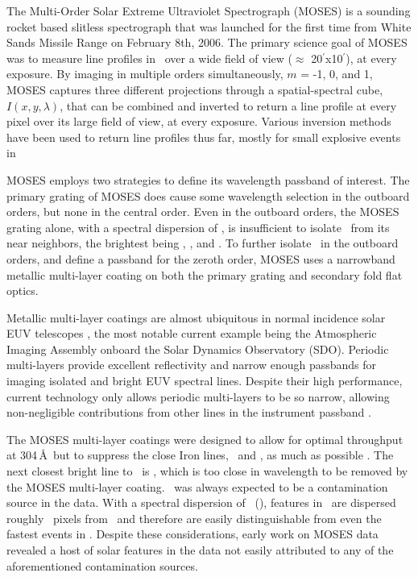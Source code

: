 	The Multi-Order Solar Extreme Ultraviolet Spectrograph (MOSES) is a sounding rocket based slitless spectrograph that was launched for the first time from White Sands Missile Range on February 8th, 2006.
	The primary science goal of MOSES was to measure line profiles in \heii \ over a wide field of view ($\approx$ 20$^{\prime}$x10$^{\prime}$), at every exposure.
	By imaging in multiple orders simultaneously, $m$ = -1, 0, and 1, MOSES captures three different projections through a spatial-spectral cube, $I(x,y,\lambda)$, that can be combined and inverted to return a line profile at every pixel over its large field of view, at every exposure.
	Various inversion methods have been used to return line profiles thus far, mostly for small explosive events in \heii\ \citep{Fox2011,Rust2019,Courrier2018}
	
	MOSES employs two strategies to define its wavelength passband of interest.
	The primary grating of MOSES does cause some wavelength selection in the outboard orders, but none in the central order.
	Even in the outboard orders, the MOSES grating alone, with a spectral dispersion of \spectdisperspix, is insufficient to isolate \heii \ from its near neighbors, the brightest being \sixi, \fexv, and \fexvi.
	To further isolate \heii\ in the outboard orders, and define a passband for the zeroth order, MOSES uses a narrowband metallic multi-layer coating on both the primary grating and secondary fold flat optics.
		
	Metallic multi-layer coatings are almost ubiquitous in normal incidence solar EUV telescopes \citep{Windt2015}, the most notable current example being the Atmospheric Imaging Assembly \citep[AIA:][]{lemen2011} onboard the Solar Dynamics Observatory (SDO).
	Periodic multi-layers provide excellent reflectivity and narrow enough passbands for imaging isolated and bright EUV spectral lines.
	Despite their high performance, current technology only allows periodic multi-layers to be so narrow, allowing non-negligible contributions from other lines in the instrument passband \citep{AIA-Response}.
	
	The MOSES multi-layer coatings were designed to allow for optimal throughput at 304\,\AA \ but to suppress the close Iron lines, \fexv\ and \fexvi, as much as possible \citep{Owens2005}.
	The next closest bright line to \heii\ is \sixi, which is too close in wavelength to be removed by the MOSES multi-layer coating.
	\sixi\ was always expected to be a contamination source in the data.
	With a spectral dispersion of \spectdisperspix\ (\spectdispersvel), features in \sixi \ are dispersed roughly \sixipix\ pixels from \heii \ and therefore are easily distinguishable from even the fastest events in \heii.
	Despite these considerations, early work on MOSES data revealed a host of solar features in the data not easily attributed to any of the aforementioned contamination sources.
	
